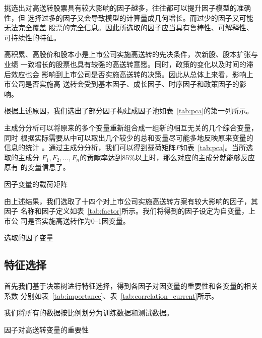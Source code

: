 \documentclass[../main]{subfiles}
\begin{document}
挑选出对高送转股票具有较大影响的因子越多，往往都可以提升因子模型的准确性，但
选择过多的因子又会导致模型的计算量成几何增长。而过少的因子又可能无法完全覆盖
股票的完全信息。因此所选取的因子应当具有鲁棒性、可解释性、可持续性的特征。

高积累、高股价和股本小是上市公司实施高送转的先决条件，次新股、股本扩张与业绩
一致增长的股票也具有较强的高送转意愿。同时，政策的变化以及时间的滞后效应也会
影响到上市公司是否实施高送转的决策。因此从总体上来看，影响上市公司是否实施高
送转会受到基本因子、成长因子、时序因子和政策因子的影响。

根据上述原因，我们选出了部分因子构建成因子池如表~\ref{tab:pca}的第一列所示。

主成分分析可以将原来的多个变量重新组合成一组新的相互无关的几个综合变量，同时
根据实际需要从中可以取出几个较少的总和变量尽可能多地反映原来变量的信息的统计
。通过主成分分析，我们可以得到载荷矩阵$P$如表~\ref{tab:pca}。当所选取的主成分
$F_1, F_2, \ldots, F_n$的贡献率达到85\%以上时，那么对应的主成分就能够反应原有
的变量信息了。

\begin{table}[htpb]
  \centering
  \caption{因子变量的载荷矩阵}%
  \label{tab:pca}
  \scriptsize
\end{table}

由上述结果，我们选取了十四个对上市公司实施高送转方案有较大影响的因子，其因子
名称和因子定义如表~\ref{tab:factor}所示。我们将得到的因子设定为自变量，上市公
司是否实施高送转作为0--1因变量。

\begin{table}[htpb]
  \centering
  \caption{选取的因子变量}%
  \label{tab:factor}
  \scriptsize
\end{table}

\subsection{特征选择}%
\label{sub:character_select}

首先我们基于决策树进行特征选择，得到各因子对因变量的重要性和各变量的相关系数
分别如表~\ref{tab:importance}、表~\ref{tab:correlation_current}所示。

我们将所有的数据按比例划分为训练数据和测试数据。

\begin{table}[htpb]
  \centering
  \caption{因子对高送转变量的重要性}%
  \label{tab:importance}
\end{table}
\end{document}
